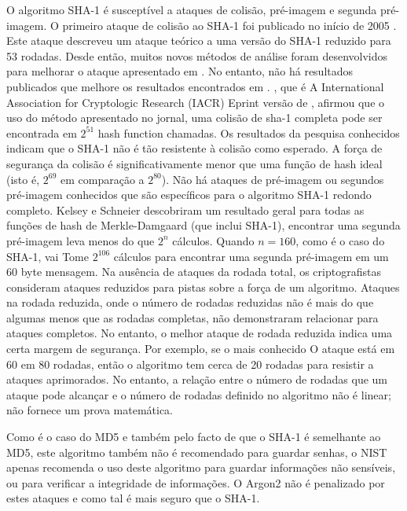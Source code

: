 \documentclass[conference]{IEEEtran}
\begin{document}
O algoritmo SHA-1 é susceptível a ataques de colisão, pré-imagem e segunda pré-imagem. 
O primeiro ataque de colisão ao SHA-1 foi publicado no início de 2005 \cite{10100797835403057436}.
Este ataque descreveu um ataque teórico a uma versão do SHA-1
reduzido para 53 rodadas. Desde então, muitos novos métodos de análise foram desenvolvidos 
para melhorar o ataque apresentado em \cite{101007115352182}. No entanto, não há resultados publicados que
melhore os resultados encontrados em \cite{101007115352182}. \cite{manuel2011}, que é
A International Association for Cryptologic Research (IACR) Eprint
versão de \cite{manuel2011}, afirmou que o uso do método apresentado no
jornal, uma colisão de sha-1 completa pode ser encontrada em $2^{51}$ hash function
chamadas. Os resultados da pesquisa conhecidos indicam que o SHA-1 não é tão
resistente à colisão como esperado. A força de segurança da colisão é
significativamente menor que uma função de hash ideal (isto é, $2^{69}$ em comparação
a $2^{80}$). Não há ataques de pré-imagem ou segundos pré-imagem conhecidos que são
específicos para o algoritmo SHA-1 redondo completo. Kelsey e Schneier \cite{kelsey2005} descobriram um
resultado geral para todas as funções de hash de Merkle-Damgaard
(que inclui SHA-1), encontrar uma segunda pré-imagem leva menos do que
$2^{n}$ cálculos. Quando $n = 160$, como é o caso do SHA-1, vai
Tome $2^{106}$ cálculos para encontrar uma segunda pré-imagem em um 60 byte
mensagem. Na ausência de ataques da rodada total, os criptografistas consideram
ataques reduzidos para pistas sobre a força de um algoritmo.
Ataques na rodada reduzida, onde o número de rodadas reduzidas não é mais
do que algumas menos que as rodadas completas, não demonstraram relacionar
para ataques completos. No entanto, o melhor ataque de rodada reduzida
indica uma certa margem de segurança. Por exemplo, se o mais conhecido
O ataque está em 60 em 80 rodadas, então o algoritmo tem cerca de 20
rodadas para resistir a ataques aprimorados. No entanto, a relação entre
o número de rodadas que um ataque pode alcançar e o número de rodadas
definido no algoritmo não é linear; não fornece um
prova matemática. \cite{rfc6194}

Como é o caso do MD5 e também pelo facto de que o SHA-1 é semelhante ao MD5, este algoritmo 
também não é recomendado para guardar senhas, o NIST apenas recomenda o uso deste algoritmo 
para guardar informações não sensíveis, ou para verificar a integridade de informações. 
O Argon2 não é penalizado por estes ataques e como tal é mais seguro que o SHA-1.
\end{document}
